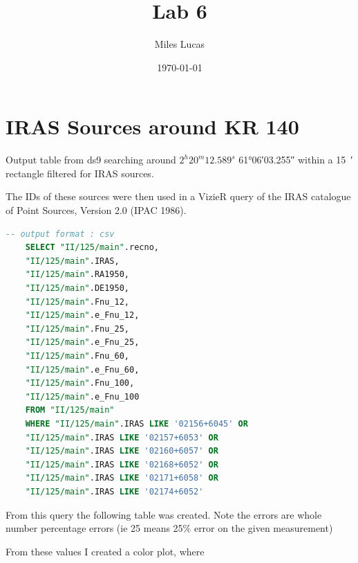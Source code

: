 \documentclass[]{article}
\title{Lab 6}
\author{Miles Lucas}
\date{\today}
\begin{document}
\maketitle

\section{IRAS Sources around KR 140}

Output table from ds9 searching around $ 2^h 20^m 12.589^s $ \ang{+61;06;03.255} within a \SI{15}{\arcminute} rectangle filtered for IRAS sources.


The IDs of these sources were then used in a VizieR query of the IRAS catalogue of Point Sources, Version 2.0 (IPAC 1986).

\begin{lstlisting}[language=SQL,basicstyle=\footnotesize,frame=single,]
	-- output format : csv
	SELECT "II/125/main".recno,  
	"II/125/main".IRAS,  
	"II/125/main".RA1950,  
	"II/125/main".DE1950,  
	"II/125/main".Fnu_12,  
	"II/125/main".e_Fnu_12,  
	"II/125/main".Fnu_25,
	"II/125/main".e_Fnu_25,  
	"II/125/main".Fnu_60,  
	"II/125/main".e_Fnu_60,  
	"II/125/main".Fnu_100,  
	"II/125/main".e_Fnu_100  
	FROM "II/125/main"
	WHERE "II/125/main".IRAS LIKE '02156+6045' OR
	"II/125/main".IRAS LIKE '02157+6053' OR
	"II/125/main".IRAS LIKE '02160+6057' OR
	"II/125/main".IRAS LIKE '02168+6052' OR
	"II/125/main".IRAS LIKE '02171+6058' OR
	"II/125/main".IRAS LIKE '02174+6052'
\end{lstlisting}

From this query the following table was created. Note the errors are whole number percentage errors (ie 25 means 25\% error on the given measurement)


From these values I created a color plot, where 
\end{document}
